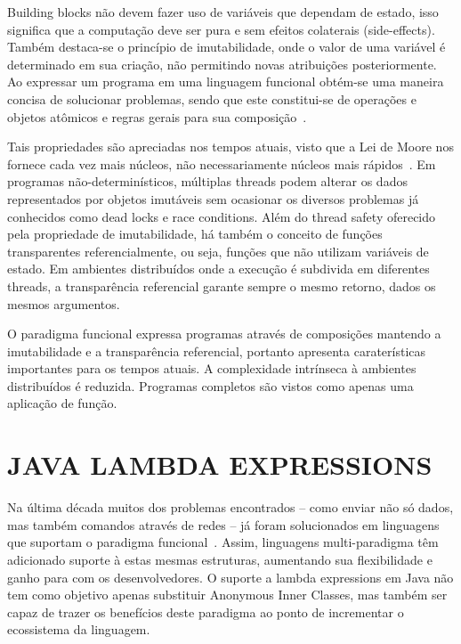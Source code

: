 \documentclass[10pt, conference]{IEEEtran}
\begin{document}
Building blocks não devem fazer uso de variáveis que dependam de estado, isso significa que a computação deve ser pura e sem efeitos colaterais (side-effects). Também destaca-se o princípio de imutabilidade, onde o valor de uma variável é determinado em sua criação, não permitindo novas atribuições posteriormente. Ao expressar um programa em uma linguagem funcional obtém-se uma maneira concisa de solucionar problemas, sendo que este constitui-se de operações e objetos atômicos e regras gerais para sua composição~\cite{michaelson2011introduction}.

Tais propriedades são apreciadas nos tempos atuais, visto que a Lei de Moore nos fornece cada vez mais núcleos, não necessariamente núcleos mais rápidos~\cite{jsr335}. Em programas não-determinísticos, múltiplas threads podem alterar os dados representados por objetos imutáveis sem ocasionar os diversos problemas já conhecidos como dead locks e race conditions. Além do thread safety oferecido pela propriedade de imutabilidade, há também o conceito de funções transparentes referencialmente, ou seja, funções que não utilizam variáveis de estado. Em ambientes distribuídos onde a execução é subdivida em diferentes threads, a transparência referencial garante sempre o mesmo retorno, dados os mesmos argumentos.

O paradigma funcional expressa programas através de composições mantendo a imutabilidade e a transparência referencial, portanto apresenta caraterísticas importantes para os tempos atuais. A complexidade intrínseca à ambientes distribuídos é reduzida. Programas completos são vistos como apenas uma aplicação de função.

\section{JAVA LAMBDA EXPRESSIONS}

Na última década muitos dos problemas encontrados -- como enviar não só dados, mas também comandos através de redes -- já foram solucionados em linguagens que suportam o paradigma funcional~\cite{fischer2015java}. Assim, linguagens multi-paradigma têm adicionado suporte à estas mesmas estruturas, aumentando sua flexibilidade e ganho para com os desenvolvedores. O suporte a lambda expressions em Java não tem como objetivo apenas substituir Anonymous Inner Classes, mas também ser capaz de trazer os benefícios deste paradigma ao ponto de incrementar o ecossistema da linguagem.
\end{document}
